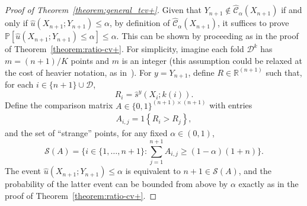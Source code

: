 \documentclass[11pt]{article}
\renewcommand{\P}[1]{\mathbb{P}\left[#1\right]}
\begin{document}
\begin{proof}[Proof of Theorem~\ref{theorem:general_tcv+}]
Given that $Y_{n+1} \notin \hat{\mathcal{C}}_{\alpha}(X_{n+1})$  if and only if $\hat{u}(X_{n+1}; Y_{n+1}) \leq \alpha$, by definition of $\hat{\mathcal{C}}_{\alpha}(X_{n+1})$, it suffices to prove $\P{\hat{u}(X_{n+1}; Y_{n+1}) \leq \alpha} \leq \alpha$. This can be shown by proceeding as in the proof of Theorem~\ref{theorem:ratio-cv+}.
For simplicity, imagine each fold $\mathcal{D}^k$ has $m=(n+1)/K$ points and $m$ is an integer (this assumption could be relaxed at the cost of heavier notation, as in~\cite{barber2019predictive}).
For $y=Y_{n+1}$, define $R \in \mathbb{R}^{(n+1)}$ such that, for each $i \in \{n+1\} \cup \mathcal{D}$,
\begin{equation*}
    R_{i}=\hat{s}^y(X_{i}; k(i)).
\end{equation*}
Define the comparison matrix $A \in \{0,1\}^{(n+1)\times(n+1)}$ with entries
\begin{align*}
    A_{i,j} = 1\left\{ R_{i} > R_{j}\right\},
\end{align*}
and the set of ``strange'' points, for any fixed $\alpha \in (0,1)$,
\begin{equation*}
    \mathcal{S}(A)=\bigg\{i \in \{1, \dots, n+1\}: \sum_{j=1}^{n+1}A_{i,j} \geq (1-\alpha)(1+n) \bigg\}.
\end{equation*}
The event $\hat{u}(X_{n+1}; Y_{n+1}) \leq \alpha$ is equivalent to $n+1 \in \mathcal{S}(A)$, and the probability of the latter event can be bounded from above by $\alpha$ exactly as in the proof of Theorem~\ref{theorem:ratio-cv+}.
\end{proof}
\end{document}
